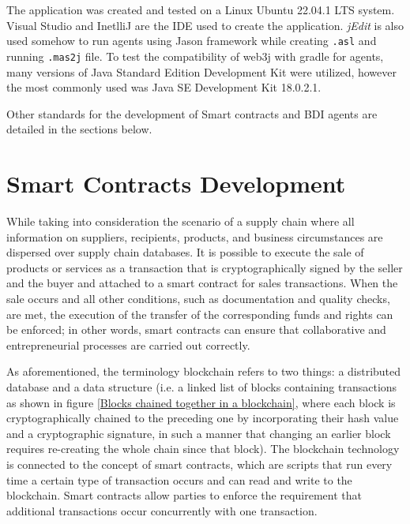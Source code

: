 \vspace{.5cm}

The application was created and tested on a Linux Ubuntu 22.04.1 LTS system.
Visual Studio and InetlliJ are the \ac{IDE} used to create the application. \textit{jEdit} is also used somehow to run agents using Jason framework while creating \texttt{.asl} and running \texttt{.mas2j} file.
To test the compatibility of web3j with gradle for agents, many versions of Java Standard Edition Development Kit were utilized, however the most commonly used was Java SE Development Kit 18.0.2.1. 

\vspace{.5cm}

Other standards for the development of Smart contracts and \ac{BDI} agents are detailed in the sections below.

\section{Smart Contracts Development }   

While taking into consideration the scenario of a supply chain where all information on suppliers, recipients, products, and business circumstances are dispersed over supply chain databases.
It is possible to execute the sale of products or services as a transaction that is cryptographically signed by the seller and the buyer and attached to a smart contract for sales transactions. When the sale occurs and all other conditions, such as documentation and quality checks, are met, the execution of the transfer of the corresponding funds and rights can be enforced; in other words, smart contracts can ensure that collaborative and entrepreneurial processes are carried out correctly.

\vspace{.5cm}

As aforementioned, the terminology blockchain refers to two things: a distributed database and a data structure (i.e. a linked list of blocks containing transactions as shown in figure \ref{Blocks chained together in a blockchain}, where each block is cryptographically chained to the preceding one by incorporating their hash value and a cryptographic signature, in such a manner that changing an earlier block requires re-creating the whole chain since that block). The blockchain technology is connected to the concept of smart contracts, which are scripts that run every time a certain type of transaction occurs and can read and write to the blockchain. Smart contracts allow parties to enforce the requirement that additional transactions occur concurrently with one transaction.

